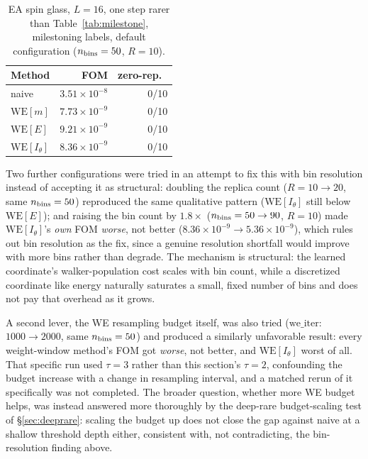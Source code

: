 \documentclass[a4paper,fleqn]{cas-sc}
\begin{document}
\begin{table}[H]
\centering\small
\caption{EA spin glass, $L=16$, one step rarer than Table~\ref{tab:milestone}, milestoning
	labels, default configuration ($n_{\rm bins}=50$, $R=10$).}
\label{tab:milestone2}
\begin{tabular}{lrr}
	\toprule
	Method & FOM & zero-rep.\ \\
	\midrule
	naive & $3.51\times10^{-8}$ & 0/10 \\
	$\mathrm{WE}[m]$ & $7.73\times10^{-9}$ & 0/10 \\
	$\mathrm{WE}[E]$ & $9.21\times10^{-9}$ & 0/10 \\
	$\mathrm{WE}[I_\theta]$ & $8.36\times10^{-9}$ & 0/10 \\
	\bottomrule
\end{tabular}
\end{table}

Two further configurations were tried in an attempt to fix this with bin resolution instead
of accepting it as structural: doubling the replica count ($R=10\to20$, same $n_{\rm
	bins}=50$) reproduced the same qualitative pattern ($\mathrm{WE}[I_\theta]$ still below
$\mathrm{WE}[E]$); and raising the bin count by $1.8\times$ ($n_{\rm bins}=50\to90$, $R=10$)
made $\mathrm{WE}[I_\theta]$'s \emph{own} FOM \emph{worse}, not better
($8.36\times10^{-9}\to5.36\times10^{-9}$), which rules out bin resolution as the fix, since
a genuine resolution shortfall would improve with more bins rather than degrade. The
mechanism is structural: the learned coordinate's walker-population cost scales with bin
count, while a discretized coordinate like energy naturally saturates a small, fixed
number of bins and does not pay that overhead as it grows.

A second lever, the WE resampling budget itself, was also tried
($\mathrm{we\_iter}$: $1000\to2000$, same $n_{\rm bins}=50$) and produced a similarly
unfavorable result: every weight-window method's FOM got \emph{worse}, not better, and
$\mathrm{WE}[I_\theta]$ worst of all. That specific run used $\tau=3$ rather than this
section's $\tau=2$, confounding the budget increase with a change in resampling interval,
and a matched rerun of it specifically was not completed. The broader question, whether
more WE budget helps, was instead answered more thoroughly by the deep-rare
budget-scaling test of \S\ref{sec:deeprare}: scaling the budget up does not close the gap
against naive at a shallow threshold depth either, consistent with, not contradicting,
the bin-resolution finding above.
\end{document}
